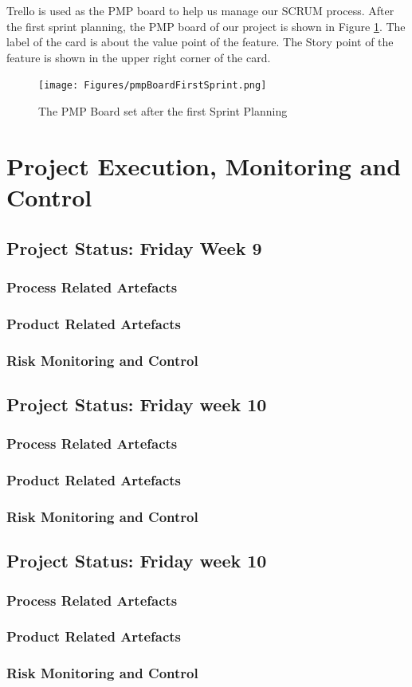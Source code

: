 \documentclass{report}
\begin{document}
Trello is used as the PMP board to help us manage our SCRUM process. After the first sprint planning, the PMP board of our project is shown in Figure \ref{fig:firstSprintPmpBoard}. The label of the card is about the value point of the feature. The Story point of the feature is shown in the upper right corner of the card.

\begin{figure}[htp]
\centering
\texttt{[image: Figures/pmpBoardFirstSprint.png]}
\caption{The PMP Board set after the first Sprint Planning}
\label{fig:firstSprintPmpBoard}
\end{figure}


\chapter{Project Execution, Monitoring and Control}
\section{Project Status: Friday Week 9}
\subsection{Process Related Artefacts}
\subsection{Product Related Artefacts}
\subsection{Risk Monitoring and Control}
\section{Project Status: Friday week 10}
\subsection{Process Related Artefacts}
\subsection{Product Related Artefacts}
\subsection{Risk Monitoring and Control}
\section{Project Status: Friday week 10}
\subsection{Process Related Artefacts}
\subsection{Product Related Artefacts}
\subsection{Risk Monitoring and Control}
\end{document}
